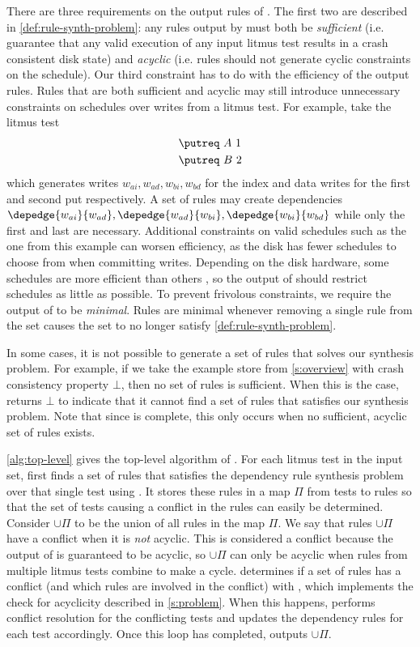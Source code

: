There are three requirements on the output rules of \depsynth.
The first two are described in \autoref{def:rule-synth-problem}: any rules output by \depsynth
must both be \textit{sufficient} (i.e. guarantee that any valid execution of any input litmus test
results in a crash consistent disk state)
and \textit{acyclic} (i.e. rules should not generate cyclic constraints on the schedule).
Our third constraint has to do with the efficiency of the output rules.
Rules that are both sufficient and acyclic may still introduce unnecessary constraints
on schedules over writes from a litmus test.
For example, take the litmus test
\begin{align*}
  &\putreq\ A\ 1\\
  &\putreq\ B\ 2
\end{align*}
which generates writes $w_{ai}, w_{ad}, w_{bi}, w_{bd}$ for the index and data writes
for the first and second put respectively.
A set of rules may create dependencies
$\depedge{w_{ai}}{w_{ad}}, \depedge{w_{ad}}{w_{bi}}, \depedge{w_{bi}}{w_{bd}}$
while only the first and last are necessary.
Additional constraints on valid schedules such as the one from this example can worsen
efficiency, as the disk has fewer schedules to choose from when committing writes.
Depending on the disk hardware, some schedules are more efficient than others ,
so the output of \depsynth should restrict schedules as little as possible.
To prevent frivolous constraints, we require the output of \depsynth to be
\textit{minimal}. Rules are minimal whenever removing a single rule from the set
causes the set to no longer satisfy \autoref{def:rule-synth-problem}.

In some cases, it is not possible to generate a set of rules that solves our
synthesis problem. For example, if we take the example store from \autoref{s:overview}
with crash consistency property $\bot$, then no set of rules is sufficient.
When this is the case, \depsynth returns $\bot$ to indicate that it cannot find
a set of rules that satisfies our synthesis problem. Note that since \depsynth
is complete, this only occurs when no sufficient, acyclic set of rules exists.

\autoref{alg:top-level} gives the top-level algorithm of \depsynth.
For each litmus test in the input set, \toplevel first finds a set
of rules that satisfies the dependency rule synthesis problem over
that single test using . It stores these rules in a map $\Pi$
from tests to rules so that the set of tests causing a conflict in the
rules can easily be determined. Consider $\cup\Pi$ to be the union of all rules
in the map $\Pi$. We say that rules $\cup\Pi$ have
a conflict when it is \textit{not} acyclic. This is considered a conflict because the output
of  is guaranteed to be acyclic, so $\cup\Pi$ can only be acyclic
when rules from multiple litmus tests combine to make a cycle.
\toplevel determines if a set of rules has a conflict (and which rules are involved in the conflict)
with , which implements the check for acyclicity described in \autoref{s:problem}.
When this happens, \toplevel performs conflict resolution for the conflicting
tests and updates the dependency rules for each test accordingly.
Once this loop has completed, \toplevel outputs $\cup\Pi$.

